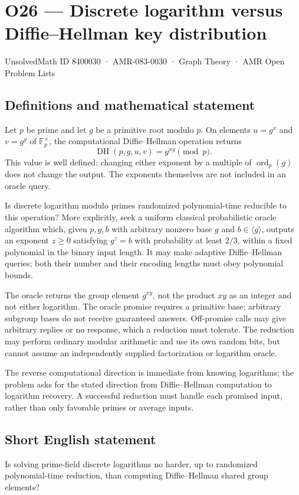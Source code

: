 \documentclass[11pt,a4paper]{article}
\begin{document}
\section*{O26 — Discrete logarithm versus Diffie–Hellman key distribution}\label{8400030}
{\small UnsolvedMath ID 8400030 · AMR-083-0030 · Graph Theory · AMR Open Problem Lists}
\subsection{Definitions and mathematical statement}
Let $p$ be prime and let $g$ be a primitive root modulo $p$. On elements $u=g^x$ and $v=g^y$ of $\mathbb F_p^\times$, the computational Diffie--Hellman operation returns
\[
\operatorname{DH}(p,g,u,v)=g^{xy}\pmod p.
\]
This value is well defined: changing either exponent by a multiple of $\operatorname{ord}_p(g)$ does not change the output. The exponents themselves are not included in an oracle query.

Is discrete logarithm modulo primes randomized polynomial-time reducible to this operation? More explicitly, seek a uniform classical probabilistic oracle algorithm which, given $p,g,b$ with arbitrary nonzero base $g$ and $b\in\langle g\rangle$, outputs an exponent $z\ge0$ satisfying $g^z=b$ with probability at least $2/3$, within a fixed polynomial in the binary input length. It may make adaptive Diffie--Hellman queries; both their number and their encoding lengths must obey polynomial bounds.

The oracle returns the group element $g^{xy}$, not the product $xy$ as an integer and not either logarithm. The oracle promise requires a primitive base; arbitrary subgroup bases do not receive guaranteed answers. Off-promise calls may give arbitrary replies or no response, which a reduction must tolerate. The reduction may perform ordinary modular arithmetic and use its own random bits, but cannot assume an independently supplied factorization or logarithm oracle.

The reverse computational direction is immediate from knowing logarithms; the problem asks for the stated direction from Diffie--Hellman computation to logarithm recovery. A successful reduction must handle each promised input, rather than only favorable primes or average inputs.
\subsection{Short English statement}
Is solving prime-field discrete logarithms no harder, up to randomized polynomial-time reduction, than computing Diffie–Hellman shared group elements?
\end{document}

